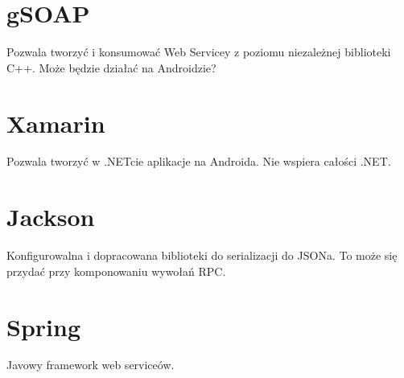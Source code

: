 \section{gSOAP}
Pozwala tworzyć i konsumować Web Servicey z poziomu niezależnej biblioteki C++. Może będzie działać na Androidzie?

\section{Xamarin}
Pozwala tworzyć w .NETcie aplikacje na Androida. Nie wspiera całości .NET.


\section{Jackson}
Konfigurowalna i dopracowana biblioteki do serializacji do JSONa. To może się przydać przy komponowaniu wywołań RPC.

%


\section{Spring}
Javowy framework web serviceów.

